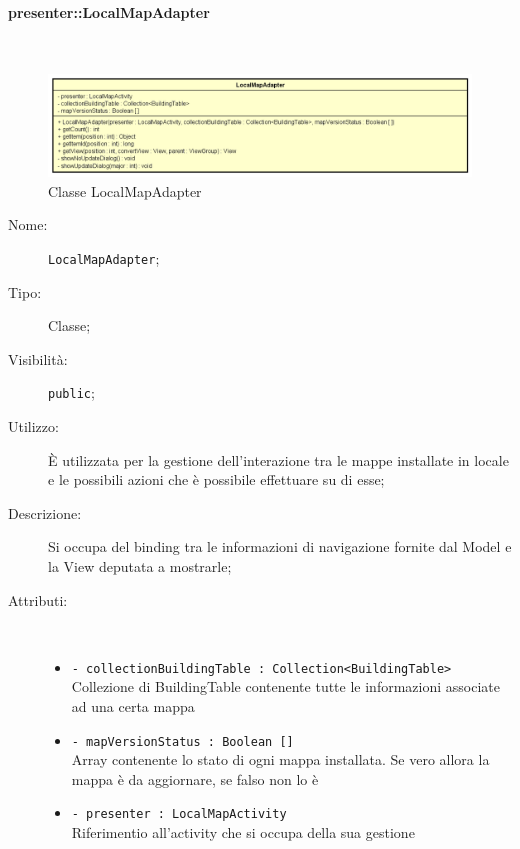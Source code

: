 \documentclass[../DefinizioneDiProdotto.tex]{subfiles}
\begin{document}
\paragraph{presenter::LocalMapAdapter}
\
\begin{figure}[H]
	\centering
	\includegraphics[width=\maxwidth]{img/LocalMapAdapter.png}
	\caption{Classe LocalMapAdapter}\label{fig:presenter::LocalMapAdapter} 
\end{figure}
\begin{description}
	\item[Nome:] \texttt{LocalMapAdapter};
	\item[Tipo:] Classe;
	\item[Visibilità:] \texttt{public};
	\item[Utilizzo:] È utilizzata per la gestione dell'interazione tra le mappe installate in locale e le possibili azioni che è possibile effettuare su di esse;
	\item[Descrizione:] Si occupa del binding tra le informazioni di navigazione fornite dal Model e la View deputata a mostrarle;
	\item[Attributi:] \
	\begin{itemize}
		\item \texttt{- collectionBuildingTable : Collection<BuildingTable>}\\
		Collezione di BuildingTable contenente tutte le informazioni associate ad una certa mappa
		
		\item \texttt{- mapVersionStatus : Boolean []}\\
		Array contenente lo stato di ogni mappa installata. Se vero allora la mappa è da aggiornare, se falso non lo è
		
		\item \texttt{- presenter : LocalMapActivity}\\
		Riferimentio all'activity che si occupa della sua gestione
		

\end{itemize}
\end{description}
\end{document}
